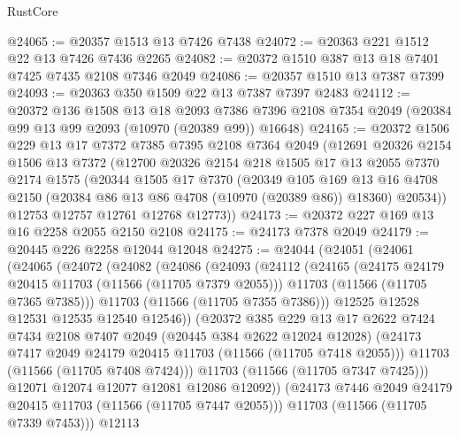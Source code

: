 \begin{lexlean}{RustCore}
\begin{coremodule}
@24065 := @20357 @1513 @13 @7426 @7438
@24072 := @20363 @221 @1512 @22 @13 @7426 @7436 @2265
@24082 := @20372 @1510 @387 @13 @18 @7401 @7425 @7435 @2108 @7346 @2049
@24086 := @20357 @1510 @13 @7387 @7399
@24093 := @20363 @350 @1509 @22 @13 @7387 @7397 @2483
@24112 := @20372
    @136
    @1508
    @13
    @18
    @2093
    @7386
    @7396
    @2108
    @7354
    @2049
    (@20384 @99 @13 @99 @2093 (@10970 (@20389 @99)) @16648)
@24165 := @20372
    @1506
    @229
    @13
    @17
    @7372
    @7385
    @7395
    @2108
    @7364
    @2049
    (@12691
      @20326
      @2154
      @1506
      @13
      @7372
      (@12700
        @20326
        @2154
        @218
        @1505
        @17
        @13
        @2055
        @7370
        @2174
        @1575
        (@20344
          @1505
          @17
          @7370
          (@20349
            @105
            @169
            @13
            @16
            @4708
            @2150
            (@20384 @86 @13 @86 @4708 (@10970 (@20389 @86)) @18360)
            @20534))
        @12753
        @12757
        @12761
        @12768
        @12773))
@24173 := @20372 @227 @169 @13 @16 @2258 @2055 @2150 @2108
@24175 := @24173 @7378 @2049
@24179 := @20445 @226 @2258 @12044 @12048
@24275 := @24044
    (@24051
      (@24061
        (@24065
          (@24072
            (@24082
              (@24086
                (@24093
                  (@24112
                    (@24165
                      (@24175 @24179 @20415 @11703 (@11566 (@11705 @7379 @2055)))
                      @11703
                      (@11566 (@11705 @7365 @7385)))
                    @11703
                    (@11566 (@11705 @7355 @7386)))
                  @12525
                  @12528
                  @12531
                  @12535
                  @12540
                  @12546))
              (@20372
                @385
                @229
                @13
                @17
                @2622
                @7424
                @7434
                @2108
                @7407
                @2049
                (@20445 @384 @2622 @12024 @12028)
                (@24173 @7417 @2049 @24179 @20415 @11703 (@11566 (@11705 @7418 @2055)))
                @11703
                (@11566 (@11705 @7408 @7424)))
              @11703
              (@11566 (@11705 @7347 @7425)))
            @12071
            @12074
            @12077
            @12081
            @12086
            @12092))
        (@24173 @7446 @2049 @24179 @20415 @11703 (@11566 (@11705 @7447 @2055)))
        @11703
        (@11566 (@11705 @7339 @7453)))
      @12113

\end{coremodule}
\end{lexlean}
